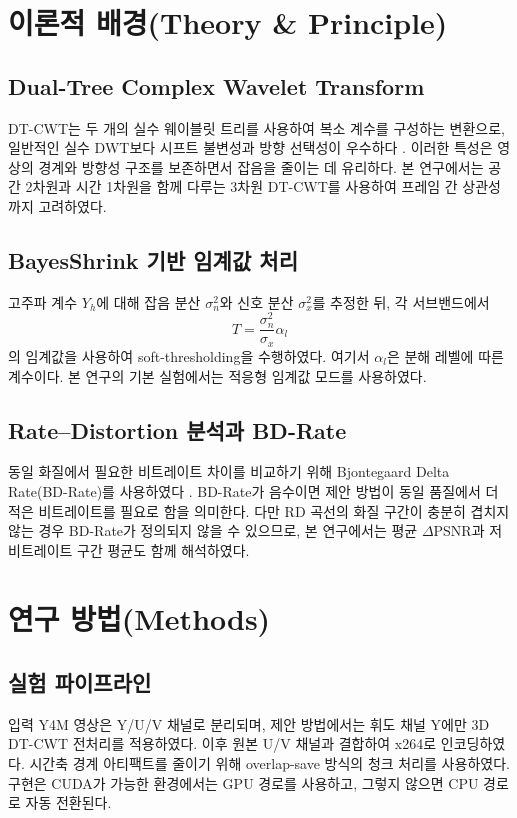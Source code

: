 \documentclass[10pt]{article}
\begin{document}
\section{\large \bf 이론적 배경(Theory \& Principle)}
\subsection{Dual-Tree Complex Wavelet Transform}
DT-CWT는 두 개의 실수 웨이블릿 트리를 사용하여 복소 계수를 구성하는 변환으로, 일반적인 실수 DWT보다 시프트 불변성과 방향 선택성이 우수하다 \cite{kingsbury1999,selesnick2005}. 이러한 특성은 영상의 경계와 방향성 구조를 보존하면서 잡음을 줄이는 데 유리하다. 본 연구에서는 공간 2차원과 시간 1차원을 함께 다루는 3차원 DT-CWT를 사용하여 프레임 간 상관성까지 고려하였다.

\subsection{BayesShrink 기반 임계값 처리}
고주파 계수 $Y_h$에 대해 잡음 분산 $\sigma_n^2$와 신호 분산 $\sigma_x^2$를 추정한 뒤, 각 서브밴드에서
\begin{equation}
T = \frac{\sigma_n^2}{\sigma_x}\alpha_l
\end{equation}
의 임계값을 사용하여 soft-thresholding을 수행하였다. 여기서 $\alpha_l$은 분해 레벨에 따른 계수이다. 본 연구의 기본 실험에서는 적응형 임계값 모드를 사용하였다.

\subsection{Rate--Distortion 분석과 BD-Rate}
동일 화질에서 필요한 비트레이트 차이를 비교하기 위해 Bjontegaard Delta Rate(BD-Rate)를 사용하였다 \cite{bjontegaard2001}. BD-Rate가 음수이면 제안 방법이 동일 품질에서 더 적은 비트레이트를 필요로 함을 의미한다. 다만 RD 곡선의 화질 구간이 충분히 겹치지 않는 경우 BD-Rate가 정의되지 않을 수 있으므로, 본 연구에서는 평균 $\Delta$PSNR과 저비트레이트 구간 평균도 함께 해석하였다.

\section{\large \bf 연구 방법(Methods)}
\subsection{실험 파이프라인}
입력 Y4M 영상은 Y/U/V 채널로 분리되며, 제안 방법에서는 휘도 채널 Y에만 3D DT-CWT 전처리를 적용하였다. 이후 원본 U/V 채널과 결합하여 x264로 인코딩하였다. 시간축 경계 아티팩트를 줄이기 위해 overlap-save 방식의 청크 처리를 사용하였다. 구현은 CUDA가 가능한 환경에서는 GPU 경로를 사용하고, 그렇지 않으면 CPU 경로로 자동 전환된다.
\end{document}
